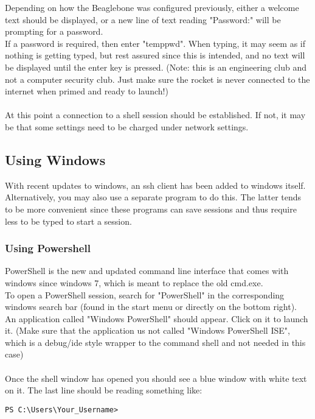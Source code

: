 \documentclass[12pt,article]{memoir}
\begin{document}
\noindent
Depending on how the Beaglebone was configured previously, either a welcome text should be displayed, or a new line of text reading "Password:" will be prompting for a password.\\
If a password is required, then enter "temppwd". When typing, it may seem as if nothing is getting typed, but rest assured since this is intended, and no text will be displayed until the enter key is pressed. (Note: this is an engineering club and not a computer security club. Just make sure the rocket is never connected to the internet when primed and ready to launch!)\\\\

\noindent
At this point a connection to a shell session should be established. If not, it may be that some settings need to be charged under network settings.\\


\newpage
\subsection{Using Windows}
With recent updates to windows, an ssh client has been added to windows itself. Alternatively, you may also use a separate program to do this. The latter tends to be more convenient since these programs can save sessions and thus require less to be typed to start a session.

\subsubsection{Using Powershell}
PowerShell is the new and updated command line interface that comes with windows since windows 7, which is meant to replace the old cmd.exe.\\
To open a PowerShell session, search for "PowerShell" in the corresponding windows search bar (found in the start menu or directly on the bottom right).\\
An application called "Windows PowerShell" should appear. Click on it to launch it. (Make sure that the application us not called "Windows PowerShell ISE", which is a debug/ide style wrapper to the command shell and not needed in this case)\\\\

\noindent
Once the shell window has opened you should see a blue window with white text on it. The last line should be reading something like:
\begin{lstlisting}
PS C:\Users\Your_Username>
\end{lstlisting}
\end{document}
